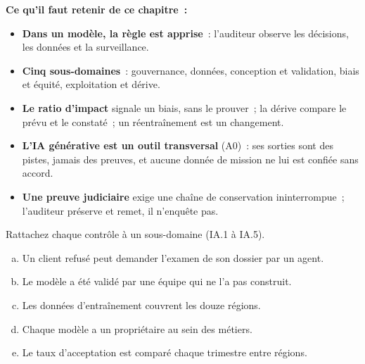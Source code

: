 
\separateur

\begin{boxresume}
\textbf{Ce qu'il faut retenir de ce chapitre~:}
\begin{itemize}
    \item \textbf{Dans un modèle, la règle est apprise}~: l'auditeur observe
          les décisions, les données et la surveillance.
    \item \textbf{Cinq sous-domaines}~: gouvernance, données, conception et
          validation, biais et équité, exploitation et dérive.
    \item \textbf{Le ratio d'impact} signale un biais, sans le prouver~; la
          dérive compare le prévu et le constaté~; un réentraînement est un
          changement.
    \item \textbf{L'IA générative est un outil transversal} (A0)~: ses
          sorties sont des pistes, jamais des preuves, et aucune donnée de
          mission ne lui est confiée sans accord.
    \item \textbf{Une preuve judiciaire} exige une chaîne de conservation
          ininterrompue~; l'auditeur préserve et remet, il n'enquête pas.
\end{itemize}
\end{boxresume}

\bigskip

\begin{boxexo}[title={\ding{45}\quad Exercice~20.1. Rattacher les contrôles \niveaubase}]
Rattachez chaque contrôle à un sous-domaine (IA.1 à IA.5).
\begin{enumerate}[(a)]
    \item Un client refusé peut demander l'examen de son dossier par un
          agent.
    \item Le modèle a été validé par une équipe qui ne l'a pas construit.
    \item Les données d'entraînement couvrent les douze régions.
    \item Chaque modèle a un propriétaire au sein des métiers.
    \item Le taux d'acceptation est comparé chaque trimestre entre régions.
\end{enumerate}
\end{boxexo}

